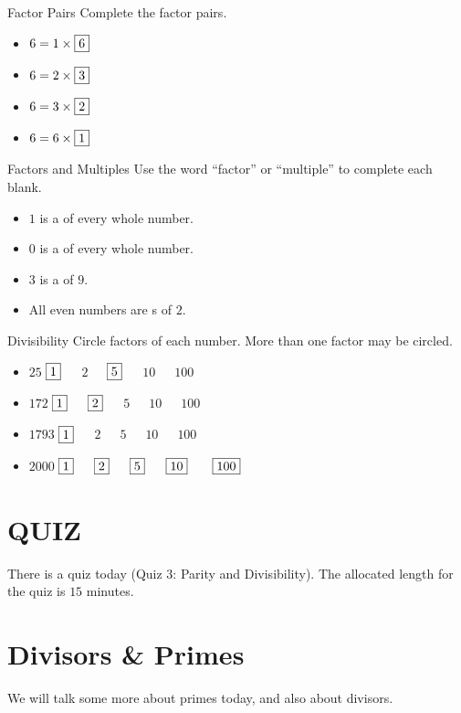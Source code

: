 \documentclass[a4paper,10pt]{report}
\begin{document}
\begin{problem}{Factor Pairs}
 Complete the factor pairs.

 \begin{itemize}
  \item $6 = 1 \times \Ans{6}$
  \item $6 = 2 \times \Ans{3}$
  \item $6 = 3 \times \Ans{2}$
  \item $6 = 6 \times \Ans{1}$
 \end{itemize}
\end{problem}

\begin{problem}{Factors and Multiples}
 Use the word ``factor'' or ``multiple'' to complete each blank.

 \begin{itemize}
  \item $1$ is a  of every whole number.
  \item $0$ is a  of every whole number.
  \item $3$ is a  of $9$.
  \item All even numbers are s of $2$.
 \end{itemize}
\end{problem}

\begin{problem}{Divisibility}
 Circle factors of each number. More than one factor may be circled.

 \begin{itemize}
  \item $25$ \hfill $\Ans{1}$~~~$2$~~~$\Ans{5}$~~~$10$~~~$100$
  \item $172$ \hfill $\Ans{1}$~~~$\Ans{2}$~~~$5$~~~$10$~~~$100$
  \item $1793$ \hfill $\Ans{1}$~~~$2$~~~$5$~~~$10$~~~$100$
  \item $2000$ \hfill $\Ans{1}$~~~$\Ans{2}$~~~$\Ans{5}$~~~$\Ans{10}$
  ~~~$\Ans{100}$
 \end{itemize}
\end{problem}

\section{QUIZ}
There is a quiz today (Quiz 3: Parity and Divisibility). The allocated length
for the quiz is $15$ minutes.

\section{Divisors \& Primes}
We will talk some more about primes today, and also about divisors.
\end{document}
